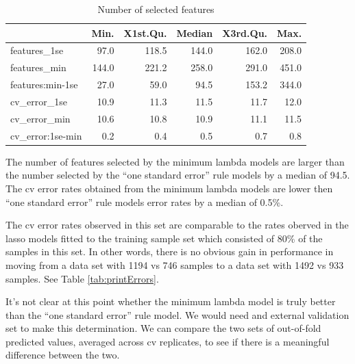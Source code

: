 \documentclass[
]{book}
\begin{document}
\begin{table}

\caption{\label{tab:brca-rnaseq-model-size-lassoAll}Number of selected features}
\centering
\begin{tabular}[t]{l|r|r|r|r|r}
\hline
  & Min. & X1st.Qu. & Median & X3rd.Qu. & Max.\\
\hline
features\_1se & 97.0 & 118.5 & 144.0 & 162.0 & 208.0\\
\hline
features\_min & 144.0 & 221.2 & 258.0 & 291.0 & 451.0\\
\hline
features:min-1se & 27.0 & 59.0 & 94.5 & 153.2 & 344.0\\
\hline
cv\_error\_1se & 10.9 & 11.3 & 11.5 & 11.7 & 12.0\\
\hline
cv\_error\_min & 10.6 & 10.8 & 10.9 & 11.1 & 11.5\\
\hline
cv\_error:1se-min & 0.2 & 0.4 & 0.5 & 0.7 & 0.8\\
\hline
\end{tabular}
\end{table}

The number of features selected by the minimum lambda models are larger
than the number selected by the ``one standard error'' rule models by a median
of 94.5.
The cv error rates obtained from the minimum lambda models are lower
then ``one standard error'' rule models error rates by a median of
0.5\%.

The cv error rates observed in this set are comparable to the
rates oberved in the lasso models fitted to the training sample set
which consisted of 80\% of the samples in this set. In other words,
there is no obvious gain in performance in moving from
a data set with
1194 vs 746 samples
to a data set with
1492 vs 933 samples.
See Table \ref{tab:printErrors}.

It's not clear at this point whether the minimum lambda model is truly better than
the ``one standard error'' rule model. We would need and external validation
set to make this determination. We can compare the two sets
of out-of-fold predicted values, averaged across cv replicates, to see if
there is a meaningful difference between the two.
\end{document}
